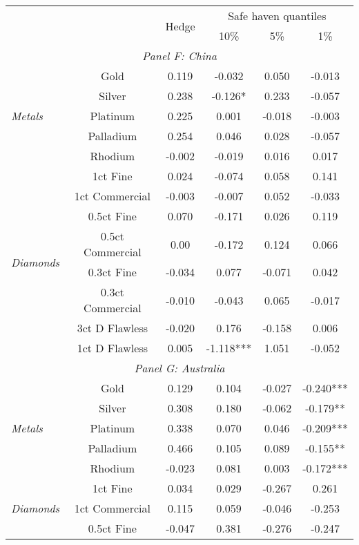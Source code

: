 \begin{tabularx}{1\textwidth}{Xccccc}
\toprule
 &    & \multirow{2}{*}{Hedge}  & \multicolumn{3}{c}{Safe haven quantiles} \\
\cmidrule(l{0.25em}){4-6} 
     &     &     & 10\% & 5\% & 1\% \\
\midrule
\multicolumn{6}{c}{\emph{Panel F: China}} \\
\multirow{5}{*}{\emph{Metals}} & Gold & 0.119 & -0.032 & 0.050 & -0.013 \\
								& Silver & 0.238 & -0.126* & 0.233 & -0.057 \\
								& Platinum & 0.225 & 0.001 & -0.018 & -0.003 \\
								& Palladium & 0.254 & 0.046 & 0.028 & -0.057 \\
								& Rhodium & -0.002 & -0.019 & 0.016 & 0.017 \\
\midrule
\multirow{8}{*}{\emph{Diamonds}} & 1ct Fine & 0.024 & -0.074 & 0.058 & 0.141 \\
								& 1ct Commercial & -0.003 & -0.007 & 0.052 & -0.033 \\
								& 0.5ct Fine & 0.070 & -0.171 & 0.026 & 0.119 \\
								& 0.5ct Commercial & 0.00 & -0.172 & 0.124 & 0.066 \\
								& 0.3ct Fine & -0.034 & 0.077 & -0.071 & 0.042 \\
								& 0.3ct Commercial & -0.010 & -0.043 & 0.065 & -0.017 \\
								& 3ct D Flawless & -0.020 & 0.176 & -0.158 & 0.006 \\
								& 1ct D Flawless & 0.005 & -1.118*** & 1.051 & -0.052 \\
\midrule
\multicolumn{6}{c}{\emph{Panel G: Australia}} \\
\multirow{5}{*}{\emph{Metals}} & Gold & 0.129 & 0.104 & -0.027 & -0.240*** \\
								& Silver & 0.308 & 0.180 & -0.062 & -0.179** \\
								& Platinum & 0.338 & 0.070 & 0.046 & -0.209*** \\
								& Palladium & 0.466 & 0.105 & 0.089 & -0.155** \\
								& Rhodium & -0.023 & 0.081 & 0.003 & -0.172*** \\
\midrule
\multirow{8}{*}{\emph{Diamonds}} & 1ct Fine & 0.034 & 0.029 & -0.267 & 0.261 \\
								& 1ct Commercial & 0.115 & 0.059 & -0.046 & -0.253 \\
								& 0.5ct Fine & -0.047 & 0.381 & -0.276 & -0.247 \\

\end{tabularx}
